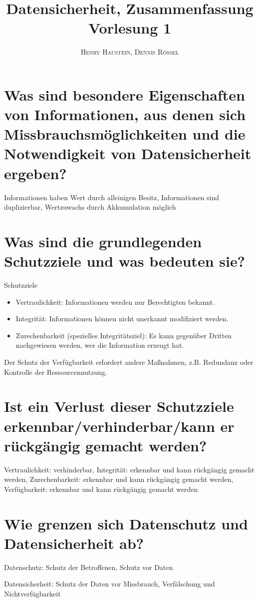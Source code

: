 \documentclass{article}
\title{\textbf{Datensicherheit, Zusammenfassung Vorlesung 1}}
\author{\textsc{Henry Haustein}, \textsc{Dennis Rössel}}
\date{}
\begin{document}
	\maketitle
	
	\section*{Was sind besondere Eigenschaften von Informationen, aus denen sich Missbrauchsmöglichkeiten und die Notwendigkeit von Datensicherheit ergeben?}
	Informationen haben Wert durch alleinigen Besitz, Informationen sind duplizierbar, Wertzuwachs durch Akkumulation möglich
	
	\section*{Was sind die grundlegenden Schutzziele und was bedeuten sie?}
	Schutzziele
	\begin{itemize}
		\item Vertraulichkeit: Informationen werden nur Berechtigten bekannt.
		\item Integrität: Informationen können nicht unerkannt modifiziert werden.
		\item Zurechenbarkeit (spezielles Integritätsziel): Es kann gegenüber Dritten nachgewiesen werden, wer die Information erzeugt hat.
	\end{itemize}
	Der Schutz der Verfügbarkeit erfordert andere Maßnahmen, z.B. Redundanz oder Kontrolle der Ressourcen\-nutzung.

	\section*{Ist ein Verlust dieser Schutzziele erkennbar/verhinderbar/kann er rückgängig gemacht werden?}
	Vertraulichkeit: verhinderbar, Integrität: erkennbar und kann rückgängig gemacht werden, Zurechenbarkeit: erkennbar und kann rückgängig gemacht werden, Verfügbarkeit: erkennbar und kann rückgängig gemacht werden
	
	\section*{Wie grenzen sich Datenschutz und Datensicherheit ab?}
	Datenschutz: Schutz der Betroffenen, Schutz vor Daten
	
	Datensicherheit: Schutz der Daten vor Missbrauch, Verfälschung und Nichtverfügbarkeit
	
\end{document}

